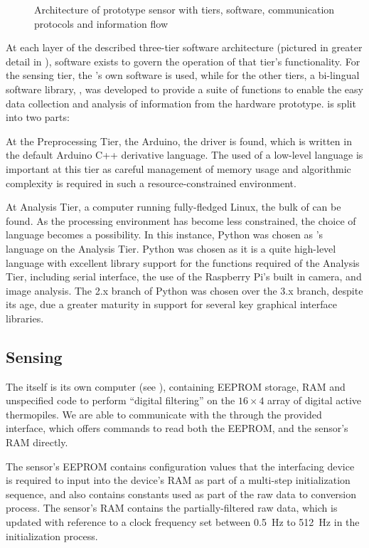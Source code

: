 \documentclass[../thesis/thesis.tex]{subfiles}
\begin{document}
\begin{figure}
\centering

\caption{Architecture of prototype sensor with tiers, software, communication protocols and information flow}
\label{fig:pictures:protob-arch}
\end{figure}

At each layer of the described three-tier software architecture (pictured in greater detail in ), software exists to govern the operation of that tier's functionality. For the sensing tier, the \mlx's own software is used, while for the other tiers, a bi-lingual software library, \tarl, was developed to provide a suite of functions to enable the easy data collection and analysis of information from the hardware prototype. \tarl is split into two parts:

At the Preprocessing Tier, the Arduino, the \tarl \mlx driver is found, which is written in the default Arduino C++ derivative language. The used of a low-level language is important at this tier as careful management of memory usage and algorithmic complexity is required in such a resource-constrained environment.

At Analysis Tier, a computer running fully-fledged Linux, the bulk of \tarl can be found. As the processing environment has become less constrained, the choice of language becomes a possibility. In this instance, Python was chosen as \tarl's language on the Analysis Tier. Python was chosen as it is a quite high-level language with excellent library support for the functions required of the Analysis Tier, including serial interface, the use of the Raspberry Pi's built in camera, and image analysis. The 2.x branch of Python was chosen over the 3.x branch, despite its age, due a greater maturity in support for several key graphical interface libraries.

\subsection{Sensing}
The \mlx itself is its own computer (see ), containing EEPROM storage, RAM and unspecified code to perform ``digital filtering'' on the $16 \times 4$ array of digital active thermopiles. We are able to communicate with the \mlx through the provided \iic interface, which offers commands to read both the EEPROM, and the sensor's RAM directly. 

The sensor's EEPROM contains configuration values that the interfacing device is required to input into the device's RAM as part of a multi-step initialization sequence, and also contains constants used as part of the raw data to \dc conversion process. The sensor's RAM contains the partially-filtered raw data, which is updated with reference to a clock frequency set between 0.5~Hz to 512~Hz in the initialization process.
\end{document}
